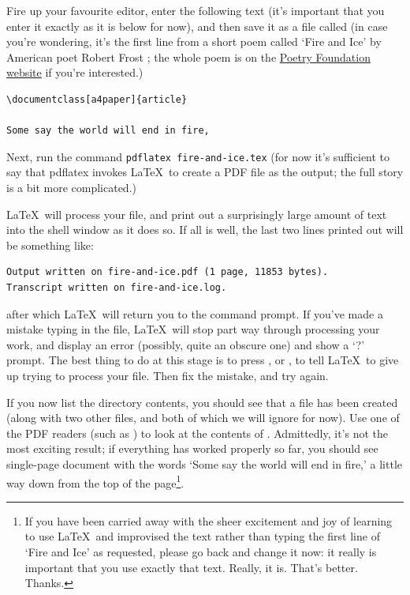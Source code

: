 \begin{refsection}
\label{sec:exercise-1}


Fire up your favourite editor, enter the following text (it's important that you enter it exactly as it is below for now), and then save it as a file called  (in case you're wondering, it's the first line from a short poem called `Fire and Ice' by American poet Robert Frost \citep{frost1923}; the whole poem is on the \href{http://www.poetryfoundation.org/poem/173527}{Poetry Foundation website} if you're interested.)

\begin{verbatim}
\documentclass[a4paper]{article}

Some say the world will end in fire,

\end{verbatim}
%
Next, run the command \texttt{pdflatex fire-and-ice.tex} (for now it's sufficient to say that pdflatex invokes \LaTeX\ to create a PDF file as the output; the full story is a bit more complicated.)

\LaTeX\ will process your file, and print out a surprisingly large amount of text into the shell window as it does so. If all is well, the last two lines printed out will be something like:

\begin{verbatim}
Output written on fire-and-ice.pdf (1 page, 11853 bytes).
Transcript written on fire-and-ice.log.
\end{verbatim}
%
after which \LaTeX\ will return you to the command prompt. If you've made a mistake typing in the file, \LaTeX\ will stop part way through processing your work, and display an error (possibly, quite an obscure one) and show a `?' prompt. The best thing to do at this stage is to press , or , to tell \LaTeX\ to give up trying to process your file. Then fix the mistake, and try again.  

If you now list the directory contents, you should see that a file   has been created (along with two other files,  and  both of which we will ignore for now). Use one of the PDF readers (such as ) to look at the contents of .  Admittedly, it's not the most exciting result; if everything has worked properly so far, you should see single-page document with the words `Some say the world will end in fire,' a little way down from the top of the page\footnote{If you have been carried away with the sheer excitement and joy of learning to use \LaTeX\, and improvised the text rather than typing the first line of `Fire and Ice' as requested, please go back and change it now: it really is important that you use exactly that text. Really, it is. That's better. Thanks.}.


\end{refsection}
